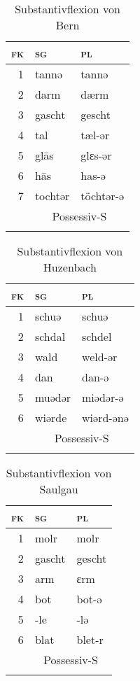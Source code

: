 \begin{table}[H]
	\caption{Substantivflexion von Bern \citep[82-90]{Marti1985}}\label{table11}
	\begin{tabular}{rll}
		\lsptoprule
		\textsc{fk} & \textsc{sg} & \textsc{pl}\\\midrule
		1 & tannə & tannə\\
		2 & darm & dærm\\
		3 & gascht & gescht\\
		4 & tal & tæl-ər\\
		5 & gl\=as & glɛs-ər\\
		6 & h\=as & has-ə\\
		7 & tochtər & töchtər-ə\\
		& \multicolumn{2}{c}{Possessiv-S}\\
		\lspbottomrule
	\end{tabular}
\end{table}


\begin{table}[H]
	\caption{Substantivflexion von Huzenbach \citep[92-98]{Baur1967}}\label{table12}
	\begin{tabular}{rll}
		\lsptoprule
		\textsc{fk} & \textsc{sg} & \textsc{pl}\\\midrule
		1 & schuə & schuə\\
		2 & schdal & schdel\\
		3 & wald & weld-ǝr\\
		4 & dan & dan-ǝ\\
		5 & muədər & miədər-ə\\
		6 & wiǝrde & wiǝrd-ǝnǝ\\
		& \multicolumn{2}{c}{Possessiv-S}\\
		\lspbottomrule
	\end{tabular}
\end{table}


\begin{table}[H]
	\caption{Substantivflexion von Saulgau \citep[100-109]{Raichle1932}}\label{table13}
\begin{tabular}{rll}
	\lsptoprule
	\textsc{fk} & \textsc{sg} & \textsc{pl}\\\midrule
	1 & molr & molr\\
	2 & gascht & gescht\\
	3 & arm & ɛrm\\
	4 & bot & bot-ǝ\\
	5 & {}-le & {}-lǝ\\
	6 & blat & blet-r\\
	& \multicolumn{2}{c}{Possessiv-S}\\
	\lspbottomrule
\end{tabular}
\end{table}

